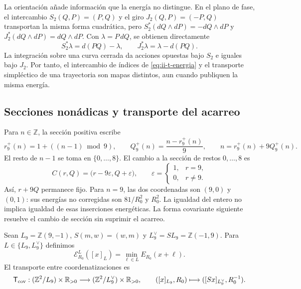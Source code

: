 La orientación añade información que la energía no distingue. En el plano
de fase, el intercambio \(S_2(Q,P)=(P,Q)\) y el giro
\(J_2(Q,P)=(-P,Q)\) transportan la misma forma cuadrática, pero
\(S_2^*(dQ\wedge dP)=-dQ\wedge dP\) y
\(J_2^*(dQ\wedge dP)=dQ\wedge dP\). Con
\(\lambda=P\,dQ\), se obtienen directamente
\[
 S_2^*\lambda=d(PQ)-\lambda,\qquad
 J_2^*\lambda=\lambda-d(PQ).
\]
La integración sobre una curva cerrada da acciones opuestas bajo \(S_2\)
e iguales bajo \(J_2\). Por tanto, el intercambio de índices de
\eqref{eq:ii-t-energia} y el transporte simpléctico de una trayectoria
son mapas distintos, aun cuando publiquen la misma energía.

\subsection{Secciones nonádicas y transporte del acarreo}

Para \(n\in\mathbb Z\), la sección positiva escribe
\[
 r_9^+(n)=1+((n-1)\bmod9),\qquad
 Q_9^+(n)=\frac{n-r_9^+(n)}9,\qquad n=r_9^+(n)+9Q_9^+(n).
\]
El resto de \(n-1\) se toma en \(\{0,\ldots,8\}\). El cambio a
la sección de restos \(0,\ldots,8\) es
\begin{equation}
 C(r,Q)=\bigl(r-9\varepsilon,Q+\varepsilon\bigr),\qquad
 \varepsilon=\begin{cases}1,&r=9,\\0,&r\ne9.\end{cases}
 \label{eq:ii-t-acarreo}
\end{equation}
Así, \(r+9Q\) permanece fijo. Para \(n=9\), las dos coordenadas
son \((9,0)\) y \((0,1)\): sus energías no corregidas son
\(81/R_0^2\) y \(R_0^2\). La igualdad del entero no implica
igualdad de esas inserciones energéticas. La forma covariante siguiente
resuelve el cambio de sección sin suprimir el acarreo.

\begin{definition}
\label{def:ii-t-cociente}
Sean \(L_9=\mathbb Z(9,-1)\), \(S(m,w)=(w,m)\) y
\(L_9^\vee=SL_9=\mathbb Z(-1,9)\). Para
\(L\in\{L_9,L_9^\vee\}\) definimos
\[
 \mathcal E_{R_0}^{L}([x]_L)
 =\min_{\ell\in L}E_{R_0}(x+\ell).
\]
El transporte entre coordenatizaciones es
\[
 \mathsf T_{\rm cov}:
 (\mathbb Z^2/L_9)\times\mathbb R_{>0}
 \longrightarrow
 (\mathbb Z^2/L_9^\vee)\times\mathbb R_{>0},\qquad
 ([x]_{L_9},R_0)\longmapsto([Sx]_{L_9^\vee},R_0^{-1}).
\]
\end{definition}

